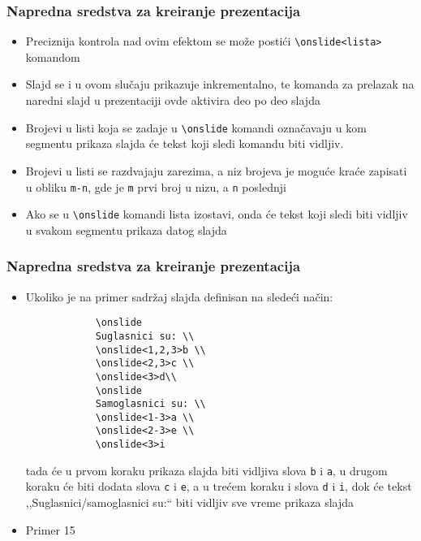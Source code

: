 \documentclass{beamer}
\begin{document}
\begin{frame}[fragile]\frametitle{Napredna sredstva za kreiranje prezentacija}
	\begin{itemize}	
		\item Preciznija kontrola nad ovim efektom se može postići \verb"\onslide<lista>" komandom		
		\item Slajd se i u ovom slučaju prikazuje inkrementalno, te komanda za
		prelazak na naredni slajd u prezentaciji ovde aktivira deo po deo slajda		
		\item	Brojevi u listi koja se zadaje u \verb"\onslide" komandi označavaju u kom segmentu
		prikaza slajda će tekst koji sledi komandu biti vidljiv. 		
		\item	Brojevi u listi se razdvajaju zarezima, a niz brojeva je moguće kraće zapisati u obliku
		\verb"m-n", gde je \verb"m" prvi broj u nizu, a \verb"n" poslednji		
		\item	Ako se u \verb"\onslide" komandi lista izostavi, onda će tekst koji sledi biti vidljiv u svakom segmentu prikaza 
		datog slajda
	\end{itemize}
\end{frame}

\begin{frame}[fragile]\frametitle{Napredna sredstva za kreiranje prezentacija}
	\begin{itemize}	
		\item Ukoliko je na primer sadržaj slajda definisan na sledeći način:		
		\footnotesize
		\begin{verbatim}
			\onslide
			Suglasnici su: \\
			\onslide<1,2,3>b \\
			\onslide<2,3>c \\
			\onslide<3>d\\
			\onslide
			Samoglasnici su: \\
			\onslide<1-3>a \\
			\onslide<2-3>e \\
			\onslide<3>i
		\end{verbatim} \normalsize		
		tada će u prvom koraku prikaza slajda biti vidljiva slova \verb"b" i \verb"a", u drugom koraku
		će biti dodata slova \verb"c" i \verb"e", a u trećem koraku i slova \verb"d" i
		\verb"i", dok će tekst ,,Suglasnici/samoglasnici su:`` biti vidljiv sve vreme prikaza slajda
		\item \textcolor{beamer@darkred}{Primer 15}
	\end{itemize}
\end{frame}
\end{document}
